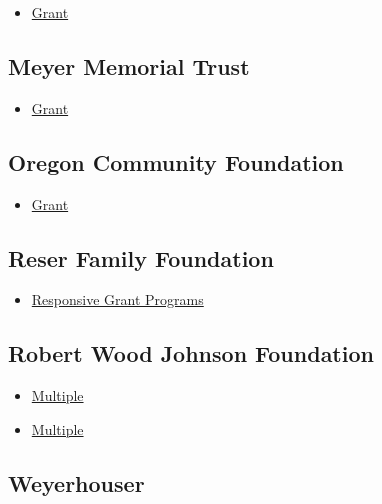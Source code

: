 \documentclass[
  letterpaper,
  DIV=11,
  numbers=noendperiod]{scrreprt}
\providecommand{\tightlist}{%
  \setlength{\itemsep}{0pt}\setlength{\parskip}{0pt}}\usepackage{longtable,booktabs,array}
\begin{document}
\begin{itemize}
\tightlist
\item
  \href{https://mcmfundgiving.org/grants/}{Grant}
\end{itemize}

\subsection{Meyer Memorial Trust}\label{meyer-memorial-trust}

\begin{itemize}
\tightlist
\item
  \href{https://mmt.org/}{Grant}
\end{itemize}

\subsection{Oregon Community
Foundation}\label{oregon-community-foundation}

\begin{itemize}
\tightlist
\item
  \href{https://oregoncf.org/grants-and-scholarships/grants/}{Grant}
\end{itemize}

\subsection{Reser Family Foundation}\label{reser-family-foundation}

\begin{itemize}
\tightlist
\item
  \href{https://thereserfamilyfoundation.org/apply-for-a-grant/}{Responsive
  Grant Programs}
\end{itemize}

\subsection{Robert Wood Johnson
Foundation}\label{robert-wood-johnson-foundation}

\begin{itemize}
\tightlist
\item
  \href{https://www.rwjf.org/en/grants.html}{Multiple}
\item
  \href{https://www.rwjf.org/en/grants/active-funding-opportunities.html?o=1&us=1}{Multiple}
\end{itemize}

\subsection{Weyerhouser}\label{weyerhouser}
\end{document}
